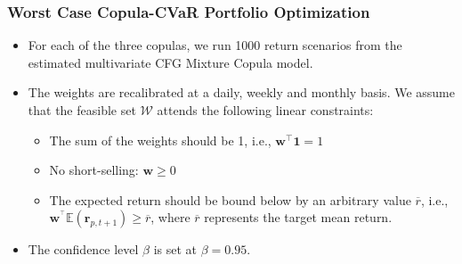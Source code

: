 \documentclass[pdf,9pt,xcolor=dvipsnames,hide notes]{beamer}
\begin{document}
\begin{frame}[label=frame5d]
\frametitle{Worst Case Copula-CVaR Portfolio Optimization}

\begin{itemize}
\justifying

	
	\item For each of the three copulas, we run 1000 return scenarios from the
	estimated multivariate CFG Mixture Copula model.
	
	\vspace{0.3cm}
	
	\item	The weights are recalibrated at a daily, weekly and monthly basis. We assume
	that the feasible set $\mathcal{W}$ attends the following linear constraints:
	
	\vspace{0.3cm}
	
	\begin{itemize}

		\item The sum of the weights should be 1, i.e., $\mathbf{w}^{\top }\mathbf{1=}1$ 
		
		\vspace{0.3cm}
		
			\item No short-selling: $\mathbf{w\geq }0$
		
			\vspace{0.3cm}
		
				\item The expected return should be bound
				below by an arbitrary value $\overline{r}$, i.e., $\mathbf{w}^{^{\top }}\mathbb{E}\left( \mathbf{r}%
		_{p,t+1}\right) \mathbf{\geq }\overline{r}$, where $\overline{r}$ represents the target mean
		return.
		
		\end{itemize}
	
	\vspace{0.3cm}
		
		
	\item The confidence level $\beta $ is
	set at $\beta =0.95$.
	
\end{itemize}


\end{frame}
\end{document}
